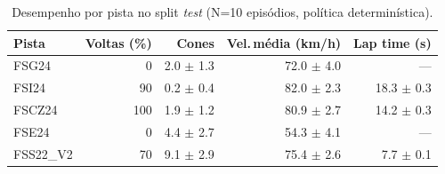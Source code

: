 \begin{table}[H]
\centering
\caption{Desempenho por pista no split \textit{test} (N=10 episódios, política determinística).}
\label{tab:per_track_test}
\begin{tabular}{lrrrr}
\toprule
\textbf{Pista} & \textbf{Voltas (\%)} & \textbf{Cones} & \textbf{Vel.\,m\'edia (km/h)} & \textbf{Lap time (s)} \\
\midrule
FSG24 & 0 & 2.0 $\pm$ 1.3 & 72.0 $\pm$ 4.0 & --- \\
FSI24 & 90 & 0.2 $\pm$ 0.4 & 82.0 $\pm$ 2.3 & 18.3 $\pm$ 0.3 \\
FSCZ24 & 100 & 1.9 $\pm$ 1.2 & 80.9 $\pm$ 2.7 & 14.2 $\pm$ 0.3 \\
FSE24 & 0 & 4.4 $\pm$ 2.7 & 54.3 $\pm$ 4.1 & --- \\
FSS22_V2 & 70 & 9.1 $\pm$ 2.9 & 75.4 $\pm$ 2.6 & 7.7 $\pm$ 0.1 \\
\bottomrule
\end{tabular}
\end{table}
